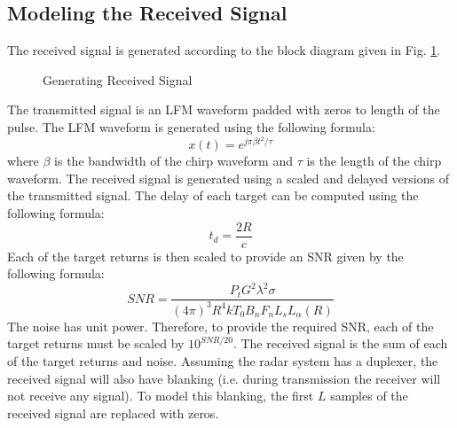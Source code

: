 \documentclass[12pt,letterpaper]{article}
\begin{document}
\subsection{Modeling the Received Signal}
The received signal is generated according to the block diagram given in Fig. \ref{Generate RX Sig}.
\begin{figure}[H]
\caption{Generating Received Signal}
\label{Generate RX Sig}
\end{figure}
\noindent
The transmitted signal is an LFM waveform padded with zeros to length of the pulse. The LFM waveform is generated using the following formula:
\begin{equation}
x(t) = e^{j\pi \beta t^2/\tau}
\label{lfm_equation}
\end{equation}
where $\beta$ is the bandwidth of the chirp waveform and $\tau$ is the length of the chirp waveform. The received signal is generated using a scaled and delayed versions of the transmitted signal. The delay of each target can be computed using the following formula:
\begin{equation}
t_d = \frac{2R}{c}
\end{equation}
Each of the target returns is then scaled to provide an SNR given by the following formula:
\begin{equation}
SNR = \frac{P_t G^2 \lambda^2 \sigma}{(4\pi)^3 R^4 k T_0 B_n F_n L_s L_\alpha(R)}
\end{equation}
The noise has unit power. Therefore, to provide the required SNR, each of the target returns must be scaled by $10^{SNR/20}$. The received signal is the sum of each of the target returns and noise. Assuming the radar system has a duplexer, the received signal will also have blanking (i.e. during transmission the receiver will not receive any signal). To model this blanking, the first $L$ samples of the received signal are replaced with zeros.
\end{document}

